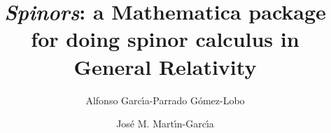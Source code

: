 \documentclass[final,3p,times,twocolumn]{elsarticle}
\begin{document}
\begin{frontmatter}



\title{{\em Spinors}: a Mathematica package for doing spinor calculus in General Relativity}


\author[a]{Alfonso Garc\'{\i}a-Parrado G\'omez-Lobo}
\author[b,c]{Jos\'e M. Mart\'{\i}n-Garc\'{\i}a}


\address[a]{Centro de Matem\'atica, Universidade do Minho. 4710-057 Braga, Portugal}
\address[b]{Laboratoire Univers et Th\'eories, Observatoire de Paris, CNRS,
Univ. Paris Diderot, 5 place Jules Janssen, 92190 Meudon, France}
\address[c]{Institut d'Astrophysique de Paris, Univ. Pierre et Marie Curie, CNRS,
98bis boulevard Arago, 75014 Paris, France
}






\end{frontmatter}
\end{document}
